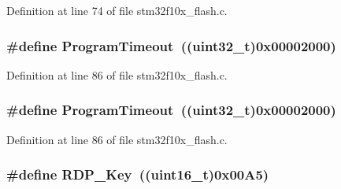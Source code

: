 Definition at line 74 of file stm32f10x\+\_\+flash.\+c.

\subsubsection[{\texorpdfstring{Program\+Timeout}{ProgramTimeout}}]{\setlength{\rightskip}{0pt plus 5cm}\#define Program\+Timeout~(({\bf uint32\+\_\+t})0x00002000)}\hypertarget{group___f_l_a_s_h___private___defines_ga0794a43966b6084d28d13c651c739385}{}\label{group___f_l_a_s_h___private___defines_ga0794a43966b6084d28d13c651c739385}


Definition at line 86 of file stm32f10x\+\_\+flash.\+c.

\subsubsection[{\texorpdfstring{Program\+Timeout}{ProgramTimeout}}]{\setlength{\rightskip}{0pt plus 5cm}\#define Program\+Timeout~(({\bf uint32\+\_\+t})0x00002000)}\hypertarget{group___f_l_a_s_h___private___defines_ga0794a43966b6084d28d13c651c739385}{}\label{group___f_l_a_s_h___private___defines_ga0794a43966b6084d28d13c651c739385}


Definition at line 86 of file stm32f10x\+\_\+flash.\+c.

\subsubsection[{\texorpdfstring{R\+D\+P\+\_\+\+Key}{RDP_Key}}]{\setlength{\rightskip}{0pt plus 5cm}\#define R\+D\+P\+\_\+\+Key~(({\bf uint16\+\_\+t})0x00\+A5)}\hypertarget{group___f_l_a_s_h___private___defines_ga34ec82060edcc9a18bf804b07dec5881}{}\label{group___f_l_a_s_h___private___defines_ga34ec82060edcc9a18bf804b07dec5881}


